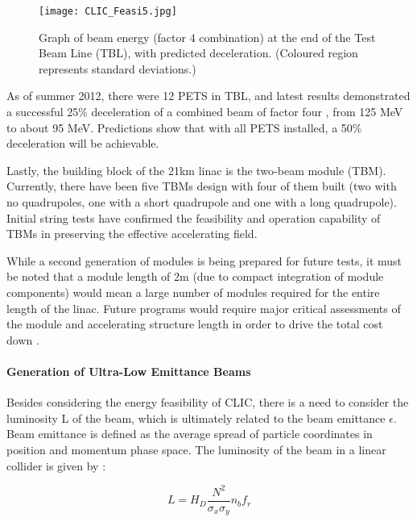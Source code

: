 \begin{figure}[!htb]
    \centering
    \texttt{[image: CLIC\_Feasi5.jpg]}
    
    \caption{Graph of beam energy (factor 4 combination) at the end of the Test Beam Line (TBL), with predicted deceleration. (Coloured region represents standard deviations.) \cite{IPAC:TwoBeamAcc}}
    \label{fig:CLIC:Feasi5}
\end{figure}

As of summer 2012, there were 12 PETS in TBL, and latest results demonstrated a successful 25\% deceleration of a combined beam of factor four \cite{IPAC:TwoBeamAcc}, from 125 MeV to about 95 MeV. Predictions show that with all PETS installed, a 50\% deceleration will be achievable.

Lastly, the building block of the 21km linac is the two-beam module (TBM). Currently, there have been five TBMs design with four of them built (two with no quadrupoles, one with a short quadrupole and one with a long quadrupole). Initial string tests have confirmed the feasibility and operation capability of TBMs in preserving the effective accelerating field.

While a second generation of modules is being prepared for future tests, it must be noted that a module length of 2m (due to compact integration of module components) would mean a large number of modules required for the entire length of the linac. Future programs would require major critical assessments of the module and accelerating structure length in order to drive the total cost down \cite{CLIC:Concept}.

\paragraph{Generation of Ultra-Low Emittance Beams}

Besides considering the energy feasibility of CLIC, there is a need to consider the luminosity L of the beam, which is ultimately related to the beam emittance $\epsilon$. Beam emittance is defined as the average spread of particle coordinates in position and momentum phase space. The luminosity of the beam in a linear collider is given by \cite{CLIC:Concept}:

\begin{equation}
    L = H_D \frac{N^2}{\sigma_x \sigma_y} n_b f_r
    \label{eq:BeamLuminosity}
\end{equation}

